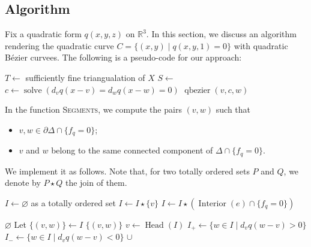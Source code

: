\documentclass[pdftex,a4paper,12pt]{scrartcl}
\theoremstyle{plain}
\theoremstyle{definition}
\theoremstyle{remark}
\begin{document}
\subsection{Algorithm}

Fix a quadratic form $q(x,y,z)$ on $\mathbb R^3$.
In this section, we discuss an algorithm rendering the quadratic curve $C=\{(x,y)\mid q(x,y,1)=0\}$ with quadratic B\'ezier curvees.
The following is a pseudo-code for our approach:
\begin{algorithmic}[1]
\State $T\gets$ sufficiently fine triangualation of $X$
\State $S\gets$ 
\State $c\gets \operatorname{solve}(d_vq(x-v)=d_wq(x-w)=0)$
\State $\operatorname{qbezier}(v,c,w)$
\EndFor
\EndFor
\EndProcedure
\end{algorithmic}
In the function \textsc{Segments}, we compute the pairs $(v,w)$ such that
\begin{itemize}
  \item $v,w\in\partial\Delta\cap\{f_q=0\}$;
  \item $v$ and $w$ belong to the same connected component of $\Delta\cap\{f_q=0\}$.
\end{itemize}
We implement it as follows.
Note that, for two totally ordered sets $P$ and $Q$, we denote by $P\star Q$ the join of them.
\begin{algorithmic}[1]
\State $I\gets\varnothing$ as a totally ordered set
\State $I\gets I\star\{v\}$
\EndIf
\EndFor
{}
\State $I\gets I\star(\operatorname{Interior}(e)\cap \{f_q=0\})$
\EndFor
\State \Return {}
\EndProcedure

\State \Return $\varnothing$
\State Let $\{(v,w)\}\gets I$
\State \Return $\{(v,w)\}$
\EndIf
\State $v\gets\operatorname{Head}(I)$
\State $I_+\gets \{w\in I\mid d_vq(w-v)>0\}$
\State $I_-\gets \{w\in I\mid d_vq(w-v)<0\}$
\State \Return {} $\cup$ 
\EndProcedure
\end{algorithmic}
\end{document}
